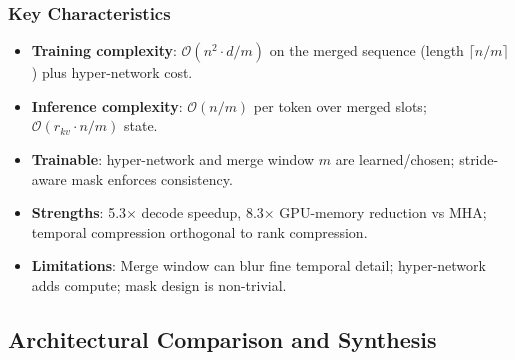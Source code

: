 \subsubsection{Key Characteristics}
\begin{itemize}[leftmargin=*]
    \item \textbf{Training complexity}: $\mathcal{O}(n^2 \cdot d / m)$ on the merged sequence (length $\lceil n/m \rceil$) plus hyper-network cost.
    \item \textbf{Inference complexity}: $\mathcal{O}(n/m)$ per token over merged slots; $\mathcal{O}(r_{kv} \cdot n / m)$ state.
    \item \textbf{Trainable}: hyper-network and merge window $m$ are learned/chosen; stride-aware mask enforces consistency.
    \item \textbf{Strengths}: 5.3$\times$ decode speedup, 8.3$\times$ GPU-memory reduction vs MHA; temporal compression orthogonal to rank compression.
    \item \textbf{Limitations}: Merge window can blur fine temporal detail; hyper-network adds compute; mask design is non-trivial.
\end{itemize}

\subsection{Architectural Comparison and Synthesis}

